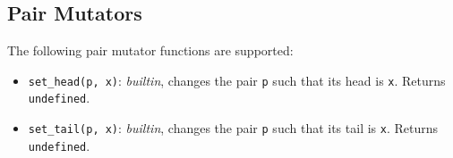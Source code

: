 \subsection*{Pair Mutators}

The following pair mutator functions are supported:

\begin{itemize}
\item \lstinline{set_head(p, x)}: \textit{builtin}, changes the pair \lstinline{p} such that its head is \lstinline{x}.
Returns \lstinline{undefined}.
\item \lstinline{set_tail(p, x)}: \textit{builtin}, changes the pair \lstinline{p} such that its tail is \lstinline{x}.
Returns \lstinline{undefined}.
\end{itemize}

  


